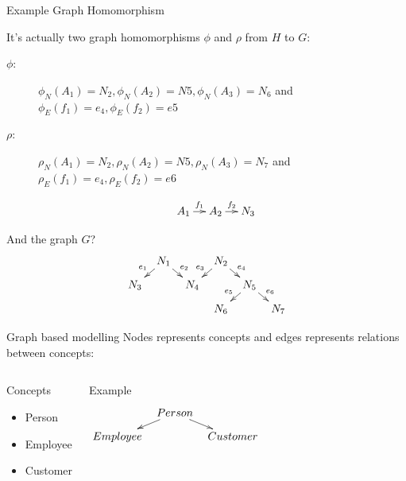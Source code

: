 \documentclass[slidetop,mathserif,red]{beamer}
\begin{document}
\begin{frame}{Example Graph Homomorphism}

It's actually two graph homomorphisms $\phi$ and $\rho$ from $H$ to $G$:
\begin{description}
\item[$\phi$:] 
$\phi_N(A_1) = N_2, \phi_N(A_2) = N5, \phi_N(A_3) =N_6$ and\\
$\phi_E(f_1) = e_4, \phi_E(f_2) = e5$
\item[$\rho$:]
$\rho_N(A_1) = N_2, \rho_N(A_2) = N5, \rho_N(A_3) =N_7$ and\\
$\rho_E(f_1) = e_4, \rho_E(f_2) = e6$
\end{description}

     \[\xymatrixrowsep{0.15in}
		\xymatrixcolsep{0.15in}
		\xymatrix{		& A_1 \ar[r]^{f_1} 	& A_2 \ar[r]	^{f_2} & N_3 } \]
		
And the graph $G$?		
		\[\xymatrixrowsep{0.1in}
		\xymatrixcolsep{0.1in}
      \xymatrix{		& N_1 \ar[dl]_{e_1} \ar[dr]	^{e_2}	&& N_2 \ar[dl]_{e_3} \ar[dr]^{e_4}\\
      					N_3		&&  N_4	& 						& N_5 \ar[dl]_{e_5} \ar[dr]^{e_6}\\
      																&&& N_6			&&  N_7} \]
\end{frame}

\begin{frame}{Graph based modelling}
Nodes represents concepts and edges represents relations between concepts:

    \begin{columns}[T]
    \begin{block}{Concepts}
        \begin{itemize}
        \item Person 
        \item Employee
        \item Customer
        \end{itemize}
    \end{block}
    \begin{block}{Example}
     \[\xymatrixrowsep{0.1in}
		\xymatrixcolsep{0.1in}
      \xymatrix{		& Person \ar[dl] \ar[dr]\\
      					Employee		&& Customer} \]
    \end{block}

  \end{columns}
\end{frame}
\end{document}
